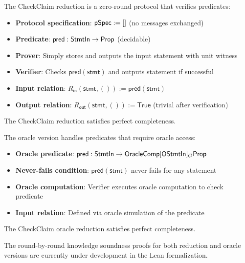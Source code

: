 \begin{definition}
    \label{def:checkclaim_reduction}
    The CheckClaim reduction is a zero-round protocol that verifies predicates:
    \begin{itemize}
        \item \textbf{Protocol specification}: $\mathsf{pSpec} := []$ (no messages exchanged)
        \item \textbf{Predicate}: $\mathsf{pred} : \mathsf{StmtIn} \to \mathsf{Prop}$ (decidable)
        \item \textbf{Prover}: Simply stores and outputs the input statement with unit witness
        \item \textbf{Verifier}: Checks $\mathsf{pred}(\mathsf{stmt})$ and outputs statement if successful
        \item \textbf{Input relation}: $R_{\mathsf{in}}(\mathsf{stmt}, ()) := \mathsf{pred}(\mathsf{stmt})$
        \item \textbf{Output relation}: $R_{\mathsf{out}}(\mathsf{stmt}, ()) := \mathsf{True}$ (trivial after verification)
    \end{itemize}
\end{definition}

\begin{theorem}
    The CheckClaim reduction satisfies perfect completeness.
\end{theorem}

\begin{definition}
    \label{def:checkclaim_oracle_reduction}
    The oracle version handles predicates that require oracle access:
    \begin{itemize}
        \item \textbf{Oracle predicate}: $\mathsf{pred} : \mathsf{StmtIn} \to \mathsf{OracleComp}[\mathsf{OStmtIn}]_{\mathcal{O}} \mathsf{Prop}$
        \item \textbf{Never-fails condition}: $\mathsf{pred}(\mathsf{stmt})$ never fails for any statement
        \item \textbf{Oracle computation}: Verifier executes oracle computation to check predicate
        \item \textbf{Input relation}: Defined via oracle simulation of the predicate
    \end{itemize}
\end{definition}

\begin{theorem}
    The CheckClaim oracle reduction satisfies perfect completeness.
\end{theorem}

\begin{remark}
    The round-by-round knowledge soundness proofs for both reduction and oracle versions are currently under development in the Lean formalization.
\end{remark}
